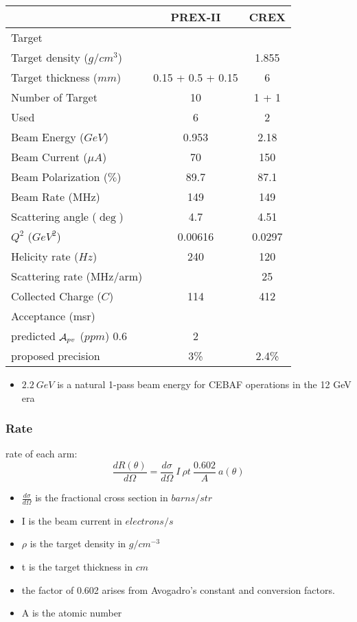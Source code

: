 \begin{table}[h]
    \centering
    \begin{tabular}{l | c c }
	\hline
	&   PREX-II & CREX  \\
	\hline
	Target	& \Pb	& \Ca	\\
	Target density ($g/cm^3$)   &	& 1.855	\\
	Target thickness ($mm$)	& 0.15 + 0.5 + 0.15	& 6	\\
	Number of Target & 10 & 1 + 1	\\
	Used	& 6 & 2	\\
	\hline
	Beam Energy ($GeV$) & 0.953 & 2.18  \\
	Beam Current ($\mu A$)	& 70	& 150	\\
	Beam Polarization ($\%$) & 89.7   & 87.1   \\
	Beam Rate (MHz) & 149	& 149	\\
	\hline
	Scattering angle ($\deg$)   & 4.7	& 4.51 \\
	$Q^2$ ($GeV^2$)	& 0.00616   & 0.0297	\\
	Helicity rate ($Hz$)  & 240   & 120   \\
	Scattering rate (MHz/arm)	&   & 25    \\
	Collected Charge ($C$)	& 114	& 412	\\
	\hline
	Acceptance (msr)    &	&   \\
	\hline
	predicted $\mathcal{A}_{pv}$ ($ppm$)  0.6   & 2	\\
	proposed precision  & 3\%   & 2.4\% \\
	\hline
    \end{tabular}
\end{table}
\begin{itemize}
    \item $2.2 \ GeV$ is a natural 1-pass beam energy for CEBAF operations in
	the 12 GeV era
\end{itemize}

\subsubsection{Rate}
rate of each arm:
\begin{equation}
    \frac{dR(\theta)}{d\Omega} = \frac{d\sigma}{d\Omega}\ I\ \rho t \  \frac{0.602}{A} \ a(\theta) 
\end{equation}
\begin{itemize}
    \item $\frac{d\sigma}{d\Omega}$ is the fractional cross section in $barns/str$
    \item I is the beam current in $electrons/s$
    \item $\rho$ is the target density in $g/cm^{-3}$
    \item t is the target thickness in $cm$
    \item the factor of 0.602 arises from Avogadro's constant and conversion factors.
    \item A is the atomic number
\end{itemize}

